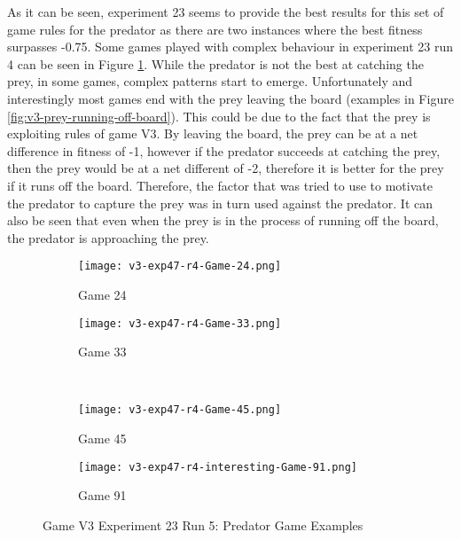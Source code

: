As it can be seen, experiment 23 seems to provide the best results for this set of game rules for the predator as there are two instances where the best fitness surpasses -0.75. Some games played with complex behaviour in experiment 23 run 4 can be seen in Figure \ref{fig:v3-pred-best-games}. While the predator is not the best at catching the prey, in some games, complex patterns start to emerge. Unfortunately and interestingly most games end with the prey leaving the board (examples in Figure \ref{fig:v3-prey-running-off-board}). This could be due to the fact that the prey is exploiting rules of game V3. By leaving the board, the prey can be at a net difference in fitness of -1, however if the predator succeeds at catching the prey, then the prey would be at a net different of -2, therefore it is better for the prey if it runs off the board. Therefore, the factor that was tried to use to motivate the predator to capture the prey was in turn used against the predator. It can also be seen that even when the prey is in the process of running off the board, the predator is approaching the prey.


\begin{figure}
  \centering
  \begin{subfigure}{0.4\textwidth}
    \centering
    \texttt{[image: v3-exp47-r4-Game-24.png]}
    \caption{Game 24}
  \end{subfigure}
  \begin{subfigure}{0.4\textwidth}
    \centering
    \texttt{[image: v3-exp47-r4-Game-33.png]}
    \caption{Game 33}
  \end{subfigure} \\\hfill
  
  \begin{subfigure}{0.4\textwidth}
    \centering
    \texttt{[image: v3-exp47-r4-Game-45.png]}
    \caption{Game 45}
  \end{subfigure}
  \begin{subfigure}{0.4\textwidth}
    \centering
    \texttt{[image: v3-exp47-r4-interesting-Game-91.png]}
    \caption{Game 91}
  \end{subfigure}
  \caption{Game V3 Experiment 23 Run 5: Predator Game Examples\label{fig:v3-pred-best-games}}
\end{figure}



